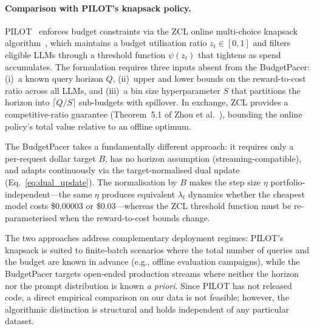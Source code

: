 \paragraph{Comparison with PILOT's knapsack policy.}
PILOT~\cite{panda2025pilot} enforces budget constraints via the
ZCL online multi-choice knapsack algorithm~\cite{zhou2008budget,
chakrabarty2008knapsack}, which maintains a budget utilisation ratio
$z_t \in [0,1]$ and filters eligible LLMs through a threshold
function $\psi(z_t)$ that tightens as spend accumulates.
The formulation requires three inputs absent from the BudgetPacer:
(i)~a known query horizon $Q$,
(ii)~upper and lower bounds on the reward-to-cost ratio across all
LLMs, and
(iii)~a bin size hyperparameter $S$ that partitions the horizon into
$\lceil Q/S \rceil$ sub-budgets with spillover.
In exchange, ZCL provides a competitive-ratio guarantee
(Theorem~5.1 of Zhou et al.~\cite{zhou2008budget}), bounding the
online policy's total value relative to an offline optimum.

The BudgetPacer takes a fundamentally different approach:
it requires only a per-request dollar target $B$, has no horizon
assumption (streaming-compatible), and adapts continuously via
the target-normalised dual update
(Eq.~\ref{eq:dual_update}).
The normalisation by $B$ makes the step size $\eta$
portfolio-independent---the same $\eta$ produces equivalent
$\lambda_t$ dynamics whether the cheapest model costs
\$0.00003 or \$0.03---whereas the ZCL threshold function must
be re-parameterised when the reward-to-cost bounds change.

The two approaches address complementary deployment regimes:
PILOT's knapsack is suited to finite-batch scenarios where the
total number of queries and the budget are known in advance
(e.g., offline evaluation campaigns), while the BudgetPacer
targets open-ended production streams where neither the horizon
nor the prompt distribution is known \emph{a priori}.
Since PILOT has not released code, a direct empirical comparison
on our data is not feasible; however, the algorithmic distinction
is structural and holds independent of any particular dataset.

